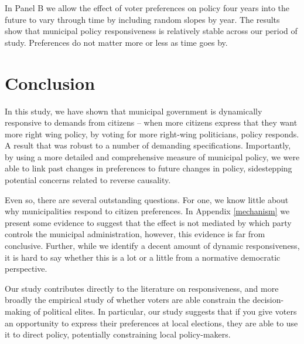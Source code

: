 \documentclass[a4paper,12pt]{article}
\begin{document}
In Panel B we allow the effect of voter preferences on policy four years into the future to vary through time by including random slopes by year. The results show that municipal policy responsiveness is relatively stable across our period of study. Preferences do not matter more or less as time goes by.




\section*{Conclusion}

In this study, we have shown that municipal government is dynamically responsive to demands from citizens -- when more citizens express that they want more right wing policy, by voting for more right-wing politicians, policy responds. A result that was robust to a number of demanding specifications. Importantly, by using a more detailed and comprehensive measure of municipal policy, we were able to link past changes in preferences to future changes in policy, sidestepping potential concerns related to reverse causality. 

Even so, there are several outstanding questions. For one, we know little about why municipalities respond to citizen preferences. In Appendix \ref{mechanism} we present some evidence to suggest that the effect is not mediated by which party controls the municipal administration, however, this evidence is far from conclusive. Further, while we identify a decent amount of dynamic responsiveness, it is hard to say whether this is a lot or a little from a normative democratic perspective.

Our study contributes directly to the literature on responsiveness, and more broadly the empirical study of whether voters are able constrain the decision-making of political elites. In particular, our study suggests that if you give voters an opportunity to express their preferences at local elections, they are able to use it to direct policy, potentially constraining local policy-makers.





\onehalfspacing



\clearpage

\renewcommand{\thesubsection}{\Alph{subsection}}
\renewcommand{\thetable}{\Alph{subsection}\arabic{table}}
\renewcommand{\thefigure}{\Alph{subsection}\arabic{figure}}
\end{document}
